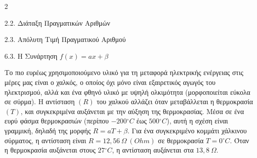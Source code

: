 \begin{ylh}{2}
    \item 2.2. Διάταξη Πραγματικών Αριθμών
    \item 2.3. Απόλυτη Τιμή Πραγματικού Αριθμού
    \item 6.3. Η Συνάρτηση $f(x)=ax+\beta$
\end{ylh}
Το πιο ευρέως χρησιμοποιούμενο υλικό για τη μεταφορά ηλεκτρικής ενέργειας στις μέρες μας είναι ο χαλκός, ο οποίος όχι μόνο είναι εξαιρετικός αγωγός του ηλεκτρισμού, αλλά και ένα φθηνό υλικό με υψηλή ολκιμότητα (μορφοποιείται εύκολα σε σύρμα). Η αντίσταση $(R)$ του χαλκού αλλάζει όταν μεταβάλλεται η θερμοκρασία $(T)$, και συγκεκριμένα αυξάνεται με την αύξηση της θερμοκρασίας. Μέσα σε ένα ευρύ φάσμα θερμοκρασιών (περίπου $- 200{^\circ}C$ έως $500{^\circ}C$), αυτή η σχέση είναι γραμμική, δηλαδή της μορφής $R = a T + \beta$. Για ένα συγκεκριμένο κομμάτι χάλκινου σύρματος, η αντίσταση είναι $R = 12,56\ \Omega\ (Ohm)$ σε θερμοκρασία $T = 0{^\circ}C$. Όταν η θερμοκρασία αυξάνεται στους $27{^\circ}C$, η αντίσταση αυξάνεται στα $13,8\ \Omega$.

